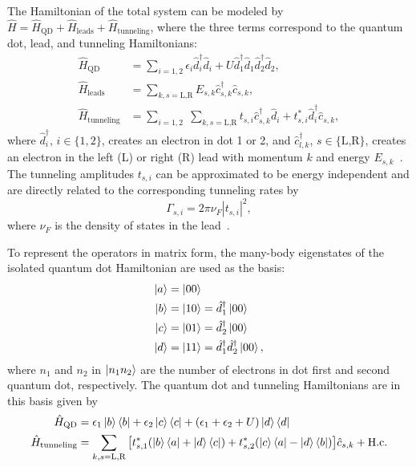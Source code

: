 \documentclass[../main.tex]{subfiles}
\begin{document}
The Hamiltonian of the total system can be modeled by $\hat H = \hat H_\text{QD} + \hat H_\text{leads} + \hat H_\text{tunneling}$, where the three terms correspond to the quantum dot, lead, and tunneling Hamiltonians:
\begin{equation}
    \begin{split}
        \hat H_\text{QD} &= \sum_{i=1,2} \epsilon_i \hat d_i^\dag \hat d_i  + U\hat d_1^\dag \hat d_1 \hat d_2^\dag \hat d_2, \\
        \hat H_\text{leads} &= \sum_{k,s=\text{L,R}} E_{s, k} \hat c_{s,k}^\dag \hat c_{s,k}, \\
        \hat H_\text{tunneling} &= \sum_{i=1,2} \; \sum_{k,s=\text{L,R}} t_{s,i} \hat c_{s,k}^\dag \hat d_i + t_{s,i}^* \hat d_i^\dag \hat c_{s,k},
    \end{split}
\end{equation}
where $\hat d_i^\dag$, $i\in\{1,2\}$, creates an electron in dot 1 or 2, and $\hat c_{l,k}^\dag$, $s\in\{\text{L,R}\}$, creates an electron in the left (L) or right (R) lead with momentum $k$ and energy $E_{s,k}$~\cite{doubledot}. The tunneling amplitudes $t_{s,i}$ can be approximated to be energy independent and are directly related to the corresponding tunneling rates by 
\begin{equation}
    \Gamma_{s,i} = 2\pi\nu_F|t_{s,i}|^2,
\end{equation}
where $\nu_F$ is the density of states in the lead~\cite{perlind}.

To represent the operators in matrix form, the many-body eigenstates of the isolated quantum dot Hamiltonian are used as the basis:
\begin{equation}\label{eq:basis}
    \begin{aligned}
        \ket{a} &= \ket{00} \\
        \ket{b} &= \ket{10} = \hat d_1^\dag\ket{00}\\
        \ket{c} &= \ket{01} = \hat d_2^\dag\ket{00}\\
        \ket{d} &= \ket{11} = \hat d_1^\dag\hat d_2^\dag\ket{00},\\
    \end{aligned}
\end{equation}
where $n_1$ and $n_2$ in $\ket{n_1n_2}$ are the number of electrons in dot first and second quantum dot, respectively. The quantum dot and tunneling Hamiltonians are in this basis given by
\begin{equation}
    \begin{aligned}
        \hat H_\text{QD} &= \epsilon_1\ket{b}\bra{b} + \epsilon_2\ket{c}\bra{c} + (\epsilon_1 + \epsilon_2 + U)\ket{d}\bra{d} \\
        \hat H_\text{tunneling} &= \sum_{k,s=\text{L,R}} \big[t_{s,1}^*(\ket{b}\bra{a} + \ket{d}\bra{c}) + t_{s,2}^*(\ket{c}\bra{a} - \ket{d}\bra{b})\big]\hat c_{s,k} + \text{H.c}.
    \end{aligned}
\end{equation}
\end{document}
